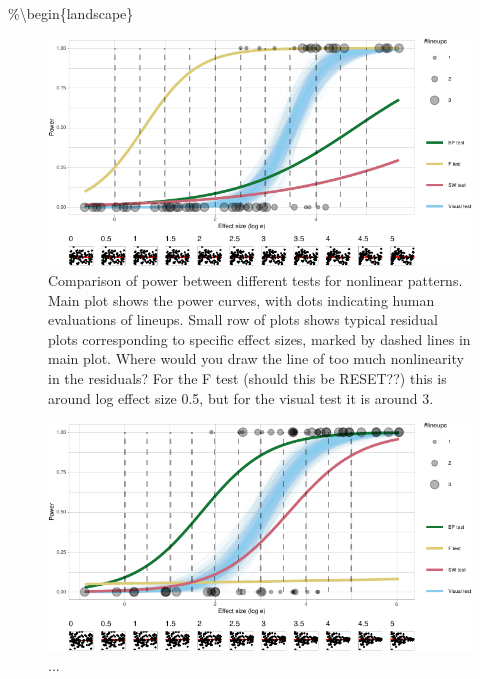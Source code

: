 \documentclass[]{interact}
\theoremstyle{plain}%
\theoremstyle{definition}
\theoremstyle{remark}
\begin{document}
\%\textbackslash begin\{landscape\}

\begin{figure}

{\centering \includegraphics[width=1\linewidth]{paper_comparison_files/figure-latex/polypower-1} 

}

\caption{Comparison of power between different tests for nonlinear patterns. Main plot shows the power curves, with dots indicating human evaluations of lineups. Small row of plots shows typical residual plots corresponding to specific effect sizes, marked by dashed lines in main plot. Where would you draw the line of too much nonlinearity in the residuals? For the F test (should this be RESET??) this is around log effect size 0.5, but for the visual test it is around 3.}\label{fig:polypower}
\end{figure}

\begin{figure}

{\centering \includegraphics[width=1\linewidth]{paper_comparison_files/figure-latex/heterpower-1} 

}

\caption{...}\label{fig:heterpower}
\end{figure}
\end{document}
